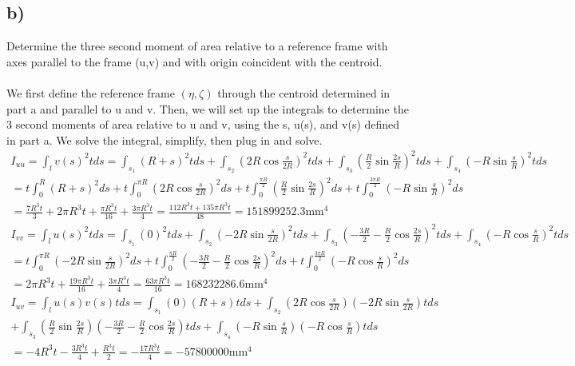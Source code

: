 \documentclass[12 pt]{article}
\begin{document}
\subsection*{b)}
Determine the three second moment of area relative to a reference frame with axes parallel to the frame (u,v) and with
origin coincident with the centroid. \\ \\
We first define the reference frame $(\eta, \zeta)$ through the centroid determined in part a and parallel to u and v.
Then, we will set up the integrals to determine the 3 second moments of area relative to u and v, using the s, u(s), and
v(s) defined in part a. We solve the integral, simplify, then plug in and solve.
\begin{align*}
    I_{uu}=\int_{l}{v(s)^2tds}=\int_{s_1}{(R+s)^2tds} + \int_{s_2}{(2R\cos{\frac{s}{2R}})^2tds}
    + \int_{s_3}{(\frac{R}{2}\sin{\frac{2s}{R}})^2tds} + \int_{s_4}{(-R\sin{\frac{s}{R}})^2tds} \\
    =t\int_{0}^{R}{(R+s)^2ds} + t\int_{0}^{\pi R}{(2R\cos{\frac{s}{2R}})^2ds}
    + t\int_{0}^{\frac{\pi R}{2}}{(\frac{R}{2}\sin{\frac{2s}{R}})^2ds} + t\int_{0}^{\frac{3\pi R}{2}}{(-R\sin{\frac{s}{R}})^2ds}
    \\ = \frac{7R^3t}{3} + 2\pi R^3t + \frac{\pi R^3t}{16} + \frac{3\pi R^3t}{4} = \frac{112R^3t + 135\pi R^3t}{48}
    = 151899252.3 \textrm{mm}^4
\end{align*}
\begin{align*}
    I_{vv}=\int_{l}{u(s)^2tds}=\int_{s_1}{(0)^2tds} + \int_{s_2}{(-2R\sin{\frac{s}{2R}})^2tds}
    + \int_{s_3}{(-\frac{3R}{2}-\frac{R}{2}\cos{\frac{2s}{R}})^2tds} + \int_{s_4}{(-R\cos{\frac{s}{R}})^2tds} \\
    = t\int_{0}^{\pi R}{(-2R\sin{\frac{s}{2R}})^2ds} + t\int_{0}^{\frac{\pi R}{2}}{(-\frac{3R}{2}-\frac{R}{2}\cos{\frac{2s}{R}})^2ds}
    + t\int_{0}^{\frac{3\pi R}{2}}{(-R\cos{\frac{s}{R}})^2ds} \\
    = 2\pi R^3t + \frac{19\pi R^3t}{16} + \frac{3\pi R^3t}{4} = \frac{63\pi R^3t}{16} = 168232286.6 \textrm{mm}^4
\end{align*}
\begin{align*}
    I_{uv}=\int_{l}{u(s)v(s)tds}=\int_{s_1}{(0)(R+s)tds} + \int_{s_2}{(2R\cos{\frac{s}{2R}})(-2R\sin{\frac{s}{2R}})tds} \\
    + \int_{s_3}{(\frac{R}{2}\sin{\frac{2s}{R}})(-\frac{3R}{2}-\frac{R}{2}\cos{\frac{2s}{R}})tds}
    + \int_{s_4}{(-R\sin{\frac{s}{R}})(-R\cos{\frac{s}{R}})tds} \\
    = -4R^3t - \frac{3R^3t}{4} + \frac{R^3t}{2} = -\frac{17R^3t}{4} = -57800000 \textrm{mm}^4
\end{align*} \\ \\
\end{document}
